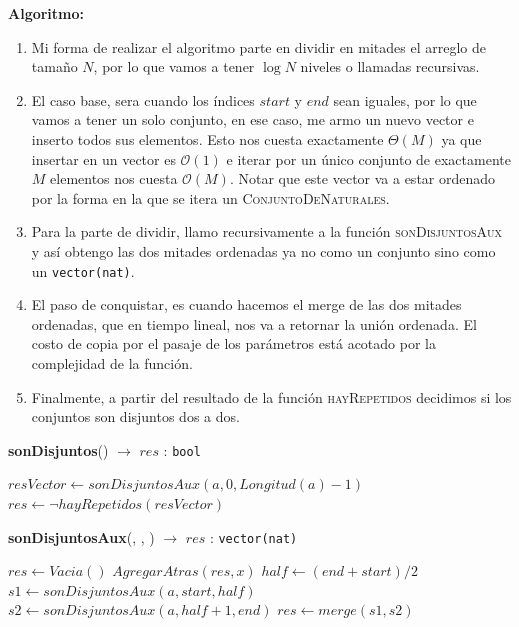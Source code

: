 \documentclass[10pt, a4paper]{article}
\newcommand{\bigO}{\mathcal{O}}
\newcommand{\asignar}[2]{$#1 \gets #2$}
\begin{document}
\textbf{Algoritmo: }
\begin{enumerate}
  \item Mi forma de realizar el algoritmo parte en dividir en mitades el arreglo de tama\~no $N$, por lo que vamos a tener $\log N$ niveles o llamadas recursivas.
  \item El caso base, sera cuando los \'indices $start$ y $end$ sean iguales, por lo que vamos a tener un solo conjunto, en ese caso, me armo un nuevo vector e inserto todos sus elementos. Esto nos cuesta exactamente $\Theta(M)$ ya que insertar en un vector es $\bigO(1)$ e iterar por un \'unico conjunto de exactamente $M$ elementos nos cuesta $\bigO(M)$. Notar que este vector va a estar ordenado por la forma en la que se itera un \textsc{ConjuntoDeNaturales}.
  \item Para la parte de dividir, llamo recursivamente a la funci\'on \textsc{sonDisjuntosAux} y as\'i obtengo las dos mitades ordenadas ya no como un conjunto sino como un \texttt{vector(nat)}.
  \item El paso de conquistar, es cuando hacemos el merge de las dos mitades ordenadas, que en tiempo lineal, nos va a retornar la uni\'on ordenada. El costo de copia por el pasaje de los par\'ametros est\'a acotado por la complejidad de la funci\'on.
  \item Finalmente, a partir del resultado de la funci\'on \textsc{hayRepetidos} decidimos si los conjuntos son disjuntos dos a dos.
\end{enumerate}

\begin{algorithm}[H]
	\caption{\textbf{sonDisjuntos}() $\to$ $res$ : \texttt{bool}}
	\begin{algorithmic}[1]
			\State \asignar{resVector}{sonDisjuntosAux(a, 0, Longitud(a) - 1)} \Comment{$\bigO(N \cdot M \cdot \log N)$}
      \State \asignar{res}{\neg hayRepetidos(resVector)} \Comment{$\bigO(N \cdot M)$}
      \State {}
			\medskip
	\end{algorithmic}
\end{algorithm}

\begin{algorithm}[H]
	\caption{\textbf{sonDisjuntosAux}(, , ) $\to$ $res$ : \texttt{vector(nat)}}
	\begin{algorithmic}[1]
        \State \asignar{res}{Vacia()}
         \Comment{$\bigO(M)$}
          \State $AgregarAtras(res, x)$ \Comment{$\bigO(1)$}
        \EndFor
      \EndIf
      \State \asignar{half}{(end + start)/2}
      \State \asignar{s1}{sonDisjuntosAux(a, start, half)} 
      \State \asignar{s2}{sonDisjuntosAux(a, half + 1, end)} 
      \State \asignar{res}{merge(s1, s2)} \Comment{$\bigO(N \cdot M)$}
      \State {}
			\medskip
	\end{algorithmic}
\end{algorithm}
\end{document}
